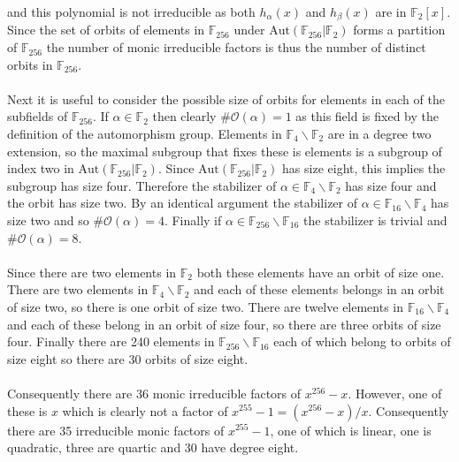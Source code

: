 \documentclass{article}
\begin{document}
and this polynomial is not irreducible as both $h_\alpha(x)$ and $h_\beta(x)$ are in $\mathbb{F}_2[x]$. 
Since the set of orbits of elements in $\mathbb{F}_{256}$ under $\text{Aut}(\mathbb{F}_{256}|\mathbb{F}_2)$ 
forms a partition of $\mathbb{F}_{256}$ the number of monic irreducible factors is thus the number 
of distinct orbits in $\mathbb{F}_{256}$.

\paragraph{}
Next it is useful to consider the possible size of orbits for elements in each of the subfields of 
$\mathbb{F}_{256}$. If $\alpha \in \mathbb{F}_2$ then clearly $\#\mathcal{O}(\alpha) = 1$ as this 
field is fixed by the definition of the automorphism group. Elements in $\mathbb{F}_4\backslash \mathbb{F}_2$ are in a 
degree two extension, so the maximal subgroup that fixes these is elements is a subgroup of index two in $\text{Aut}(\mathbb{F}_{256}|\mathbb{F}_2)$. 
Since $\text{Aut}(\mathbb{F}_{256}|\mathbb{F}_2)$ has size eight, this implies the subgroup has size 
four. Therefore the stabilizer of $\alpha \in \mathbb{F}_4\backslash \mathbb{F}_2$ has size four and the orbit has size two. 
By an identical argument the stabilizer of $\alpha \in \mathbb{F}_{16}\backslash \mathbb{F}_4$ has size 
two and so $\#\mathcal{O}(\alpha) = 4$. Finally if $\alpha \in \mathbb{F}_{256}\backslash \mathbb{F}_{16}$ 
the stabilizer is trivial and $\#\mathcal{O}(\alpha) = 8$. 

\paragraph{}
Since there are two elements in $\mathbb{F}_2$ both these elements have an orbit of size one. 
There are two elements in $\mathbb{F}_4\backslash \mathbb{F}_2$ and each of these elements belongs 
in an orbit of size two, so there is one orbit of size two. There are twelve elements in $\mathbb{F}_{16}\backslash \mathbb{F}_4$ 
and each of these belong in an orbit of size four, so there are three orbits of size four. Finally 
there are 240 elements in $\mathbb{F}_{256}\backslash \mathbb{F}_{16}$ each of which belong to 
orbits of size eight so there are 30 orbits of size eight. 

\paragraph{}
Consequently there are 36 monic irreducible factors of $x^{256}-x$. However, one of these is 
$x$ which is clearly not a factor of $x^{255}-1 = (x^{256}-x)/x$. Consequently there are 
35 irreducible monic factors of $x^{255}-1$, one of which is linear, one is quadratic, three are quartic and 
30 have degree eight.
\end{document}
